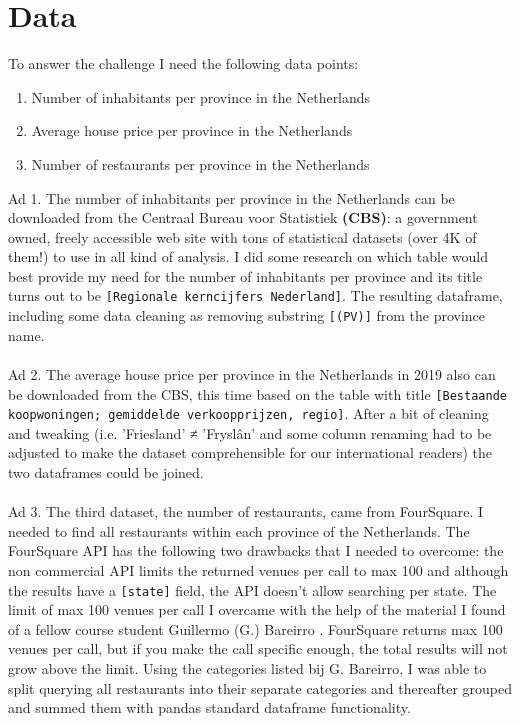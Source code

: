 \section{Data}
To answer the challenge I need the following data points:
\medskip
\begin{enumerate}
  \item Number of inhabitants per province in the Netherlands
  \item Average house price per province in the Netherlands
  \item Number of restaurants per province in the Netherlands
\end{enumerate}
\medskip
Ad 1. The number of inhabitants per province in the Netherlands can be downloaded from the Centraal Bureau voor Statistiek \textbf{(CBS)}: a government owned, freely accessible web site with tons of statistical datasets (over 4K of them!) to use in all kind of analysis. I did some research on which table would best provide my need for the number of inhabitants per province and its title turns out to be \texttt{[Regionale kerncijfers Nederland]}. The resulting dataframe, including some data cleaning as removing substring \texttt{[(PV)]} from the province name.
\\\\
Ad 2. The average house price per province in the Netherlands in 2019 also can be downloaded from the CBS, this time based on the table with title \texttt{[Bestaande koopwoningen; gemiddelde verkoopprijzen, regio]}. After a bit of cleaning and tweaking (i.e. 'Friesland' ≠ 'Fryslân' and some column renaming had to be adjusted to make the dataset comprehensible for our international readers) the two dataframes could be joined.
\\\\
Ad 3. The third dataset, the number of restaurants, came from FourSquare. I needed to find all restaurants within each province of the Netherlands. The FourSquare API has the following two drawbacks that I needed to overcome: the non commercial API limits the returned venues per call to max 100 and although the results have a \texttt{[state]} field, the API doesn't allow searching per state. The limit of max 100 venues per call I overcame with the help of the material I found of a fellow course student Guillermo (G.) Bareirro \cite{STUDENT1}. FourSquare returns max 100 venues per call, but if you make the call specific enough, the total results will not grow above the limit. Using the categories listed bij G. Bareirro, I was able to split querying all restaurants into their separate categories and thereafter grouped and summed them with pandas standard dataframe functionality. 
